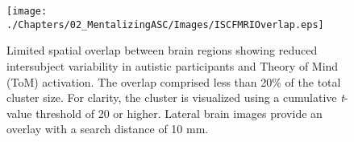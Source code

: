 \begin{figure}[!ht]
	\centering
    \texttt{[image: ./Chapters/02\_MentalizingASC/Images/ISCFMRIOverlap.eps]}
	\caption{Limited spatial overlap between brain regions showing reduced intersubject variability in autistic participants and Theory of Mind (ToM) activation. The overlap comprised less than 20\% of the total cluster size. For clarity, the cluster is visualized using a cumulative \textit{t}-value threshold of 20 or higher. Lateral brain images provide an overlay with a search distance of 10 mm. }
    \vspace*{-10pt}
	\label{fig:isc-fmri-overlap}
\end{figure}



